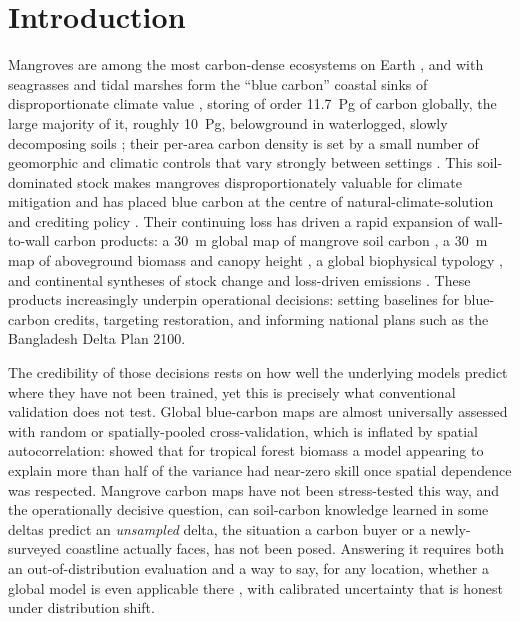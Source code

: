 \documentclass[11pt]{article}
\begin{document}
\section{Introduction}
Mangroves are among the most carbon-dense ecosystems on Earth
\citep{donato2011,mcleod2011}, and with seagrasses and tidal marshes form the
``blue carbon'' coastal sinks of disproportionate climate value \citep{fourqurean2012},
storing of order 11.7~Pg of carbon globally, the large majority of it, roughly 10~Pg, belowground in waterlogged, slowly decomposing soils
\citep{kauffman2020}; their per-area carbon density is set by a small number of
geomorphic and climatic controls that vary strongly between settings \citep{rovai2018}.
This soil-dominated stock makes mangroves disproportionately valuable for climate
mitigation and has placed blue carbon at the centre of natural-climate-solution and
crediting policy \citep{macreadie2021,friess2019}. Their continuing loss
\citep{hamilton2018,richards2020netloss} has driven a rapid expansion of wall-to-wall
carbon products: a 30~m global map of mangrove soil carbon \citep{sanderman2018}, a
30~m map of aboveground biomass and canopy height \citep{simard2019}, a global
biophysical typology \citep{worthington2020}, and continental syntheses of stock change
and loss-driven emissions \citep{richards2020netloss,adame2021future}. These products
increasingly underpin operational decisions: setting baselines for blue-carbon credits,
targeting restoration, and informing national plans such as the Bangladesh Delta Plan
2100.

The credibility of those decisions rests on how well the underlying models predict
where they have not been trained, yet this is precisely what conventional validation
does not test. Global blue-carbon maps are almost universally assessed with random or
spatially-pooled cross-validation, which is inflated by spatial autocorrelation:
\citet{ploton2020} showed that for tropical forest biomass a model appearing to
explain more than half of the variance had near-zero skill once spatial dependence was
respected. Mangrove carbon maps have not been stress-tested this way, and the operationally decisive question, can soil-carbon knowledge learned in some deltas
predict an \emph{unsampled} delta, the situation a carbon buyer or a newly-surveyed
coastline actually faces, has not been posed. Answering it requires both an
out-of-distribution evaluation and a way to say, for any location, whether a global
model is even applicable there \citep{meyer2021}, with calibrated uncertainty that is
honest under distribution shift.
\end{document}
